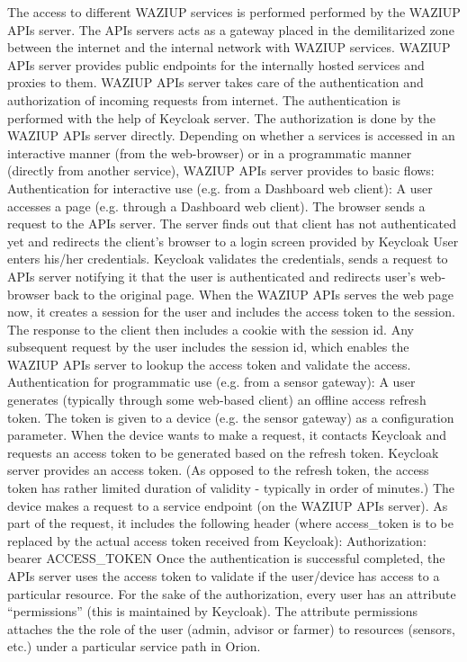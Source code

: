 The access to different WAZIUP services is performed performed by the WAZIUP APIs server. The APIs servers acts as a gateway placed in the demilitarized zone between the internet and the internal network with WAZIUP services. WAZIUP APIs server provides public endpoints for the internally hosted services and proxies to them. 
WAZIUP APIs server takes care of the authentication and authorization of incoming requests from internet. The authentication is performed with the help of Keycloak server. The authorization is done by the WAZIUP APIs server directly.
Depending on whether a services is accessed in an interactive manner (from the web-browser) or in a programmatic manner (directly from another service), WAZIUP APIs server provides to basic flows:
Authentication for interactive use (e.g. from a Dashboard web client):
A user accesses a page (e.g. through a Dashboard web client). The browser sends a request to the APIs server.
The server finds out that client has not authenticated yet and redirects the client’s browser to a login screen provided by Keycloak
User enters his/her credentials.
Keycloak validates the credentials, sends a request to APIs server notifying it that the user is authenticated and redirects user’s web-browser back to the original page.
When the WAZIUP APIs serves the web page now, it creates a session for the user and includes the access token to the session. The response to the client then includes a cookie with the session id.
Any subsequent request by the user includes the session id, which enables the WAZIUP APIs server to lookup the access token and validate the access.
Authentication for programmatic use (e.g. from a sensor gateway):
A user generates (typically through some web-based client) an offline access refresh token. The token is given to a device (e.g. the sensor gateway) as a configuration parameter.
When the device wants to make a request, it contacts Keycloak and requests an access token to be generated based on the refresh token.
Keycloak server provides an access token. (As opposed to the refresh token, the access token has rather limited duration of validity - typically in order of minutes.)
The device makes a request to a service endpoint (on the WAZIUP APIs server). As part of the request, it includes the following header (where access\_token is to be replaced by the actual access token received from Keycloak):
Authorization: bearer ACCESS\_TOKEN
Once the authentication is successful completed, the APIs server uses the access token to validate if the user/device has access to a particular resource.
For the sake of the authorization, every user has an attribute “permissions” (this is maintained by Keycloak). The attribute permissions attaches the the role of the user (admin, advisor or farmer) to resources (sensors, etc.) under a particular service path in Orion. 

